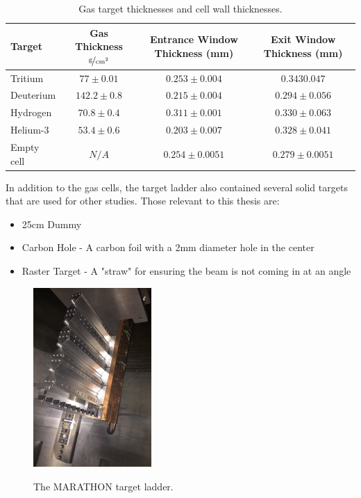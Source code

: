 \begin{table}[h]
\begin{tabular}{|l|c|c|c|}
\hline
Target & Gas Thickness $\nicefrac{\textrm{g}}{\textrm{cm}^2}$ & Entrance Window Thickness (mm) & Exit Window Thickness (mm) \\
\hline
\hline
Tritium & $77\pm0.01$ & $0.253\pm0.004$ & $0.3430.047$\\ \hline
Deuterium & $142.2\pm0.8$ & $0.215\pm0.004$ & $0.294\pm0.056$\\ \hline
Hydrogen & $70.8\pm0.4$ & $0.311\pm0.001$ & $0.330\pm0.063$\\ \hline
Helium-3 & $53.4\pm0.6$ & $0.203\pm0.007$ & $0.328\pm0.041$\\ \hline
Empty cell & $N/A$ & $0.254\pm0.0051$ & $0.279\pm0.0051$\\ \hline
\end{tabular}
\caption{Gas target thicknesses and cell wall thicknesses.\cite{targ_meas}}
\label{tbl:gas_targs}
\end{table}

In addition to the gas cells, the target ladder also contained several solid targets that are used for other studies. Those relevant to this thesis are:
\begin{itemize}
	\item 25cm Dummy
	\item Carbon Hole - A carbon foil with a 2mm diameter hole in the center
	\item Raster Target - A "straw" for ensuring the beam is not coming in at an angle
\end{itemize}

\begin{figure}[h]
\begin{center}
	\includegraphics[width=0.4\textwidth]{./setup/fig/target.png}
	\label{fig:target}
	\caption{The MARATHON target ladder.}
\end{center}
\end{figure}

